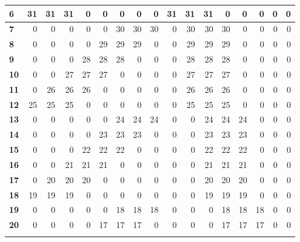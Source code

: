 \begin{table}[ht]
{\begin{tabular}{|l|r|r|r|r|r|r|r|r|r|r|r|r|r|r|r|r|}
				\textbf{6}  & 31 & 31 & 31 & 0  & 0  & 0  & 0  & 0  & 31 & 31 & 31 & 0  & 0  & 0  & 0  & 0 \\ \hline
				\rowcolor[HTML]{E2EFDA} 
				\textbf{7}  & 0  & 0  & 0  & 0  & 0  & 30 & 30 & 30 & 0  & 30 & 30 & 30 & 0  & 0  & 0  & 0 \\ \hline
				\rowcolor[HTML]{FFFFFF} 
				\textbf{8}  & 0  & 0  & 0  & 0  & 29 & 29 & 29 & 0  & 0  & 29 & 29 & 29 & 0  & 0  & 0  & 0 \\ \hline
				\rowcolor[HTML]{E2EFDA} 
				\textbf{9}  & 0  & 0  & 0  & 28 & 28 & 28 & 0  & 0  & 0  & 28 & 28 & 28 & 0  & 0  & 0  & 0 \\ \hline
				\rowcolor[HTML]{FFFFFF} 
				\textbf{10} & 0  & 0  & 27 & 27 & 27 & 0  & 0  & 0  & 0  & 27 & 27 & 27 & 0  & 0  & 0  & 0 \\ \hline
				\rowcolor[HTML]{E2EFDA} 
				\textbf{11} & 0  & 26 & 26 & 26 & 0  & 0  & 0  & 0  & 0  & 26 & 26 & 26 & 0  & 0  & 0  & 0 \\ \hline
				\rowcolor[HTML]{FFFFFF} 
				\textbf{12} & 25 & 25 & 25 & 0  & 0  & 0  & 0  & 0  & 0  & 25 & 25 & 25 & 0  & 0  & 0  & 0 \\ \hline
				\rowcolor[HTML]{E2EFDA} 
				\textbf{13} & 0  & 0  & 0  & 0  & 0  & 24 & 24 & 24 & 0  & 0  & 24 & 24 & 24 & 0  & 0  & 0 \\ \hline
				\rowcolor[HTML]{FFFFFF} 
				\textbf{14} & 0  & 0  & 0  & 0  & 23 & 23 & 23 & 0  & 0  & 0  & 23 & 23 & 23 & 0  & 0  & 0 \\ \hline
				\rowcolor[HTML]{E2EFDA} 
				\textbf{15} & 0  & 0  & 0  & 22 & 22 & 22 & 0  & 0  & 0  & 0  & 22 & 22 & 22 & 0  & 0  & 0 \\ \hline
				\rowcolor[HTML]{FFFFFF} 
				\textbf{16} & 0  & 0  & 21 & 21 & 21 & 0  & 0  & 0  & 0  & 0  & 21 & 21 & 21 & 0  & 0  & 0 \\ \hline
				\rowcolor[HTML]{E2EFDA} 
				\textbf{17} & 0  & 20 & 20 & 20 & 0  & 0  & 0  & 0  & 0  & 0  & 20 & 20 & 20 & 0  & 0  & 0 \\ \hline
				\rowcolor[HTML]{FFFFFF} 
				\textbf{18} & 19 & 19 & 19 & 0  & 0  & 0  & 0  & 0  & 0  & 0  & 19 & 19 & 19 & 0  & 0  & 0 \\ \hline
				\rowcolor[HTML]{E2EFDA} 
				\textbf{19} & 0  & 0  & 0  & 0  & 0  & 18 & 18 & 18 & 0  & 0  & 0  & 18 & 18 & 18 & 0  & 0 \\ \hline
				\rowcolor[HTML]{FFFFFF} 
				\textbf{20} & 0  & 0  & 0  & 0  & 17 & 17 & 17 & 0  & 0  & 0  & 0  & 17 & 17 & 17 & 0  & 0 \\ \hline
				\rowcolor[HTML]{E2EFDA} 

\end{tabular}}
\end{table}
